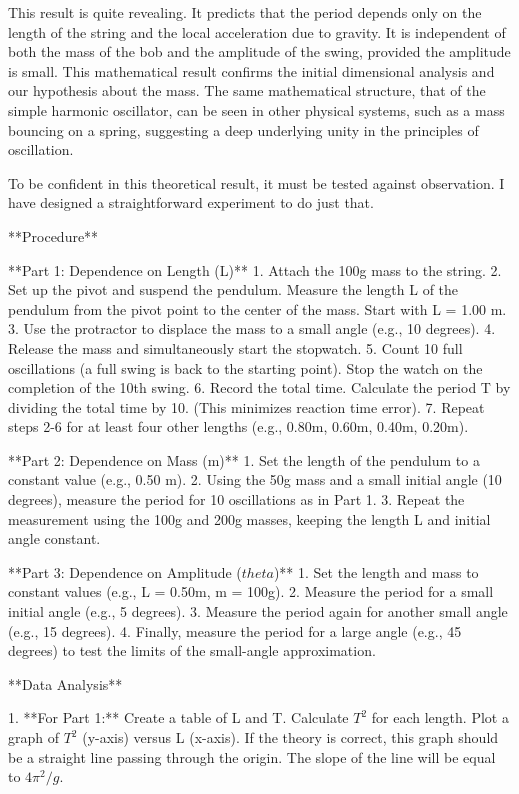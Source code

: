 \documentclass[12pt]{article}
\begin{document}
This result is quite revealing. It predicts that the period depends only on the length of the string and the local acceleration due to gravity. It is independent of both the mass of the bob and the amplitude of the swing, provided the amplitude is small. This mathematical result confirms the initial dimensional analysis and our hypothesis about the mass. The same mathematical structure, that of the simple harmonic oscillator, can be seen in other physical systems, such as a mass bouncing on a spring, suggesting a deep underlying unity in the principles of oscillation.
\par
\bigskip
To be confident in this theoretical result, it must be tested against observation. I have designed a straightforward experiment to do just that.

**Procedure**

**Part 1: Dependence on Length (L)**
1.  Attach the 100g mass to the string.
2.  Set up the pivot and suspend the pendulum. Measure the length L of the pendulum from the pivot point to the center of the mass. Start with L = 1.00 m.
3.  Use the protractor to displace the mass to a small angle (e.g., 10 degrees).
4.  Release the mass and simultaneously start the stopwatch.
5.  Count 10 full oscillations (a full swing is back to the starting point). Stop the watch on the completion of the 10th swing.
6.  Record the total time. Calculate the period T by dividing the total time by 10. (This minimizes reaction time error).
7.  Repeat steps 2-6 for at least four other lengths (e.g., 0.80m, 0.60m, 0.40m, 0.20m).

**Part 2: Dependence on Mass (m)**
1.  Set the length of the pendulum to a constant value (e.g., 0.50 m).
2.  Using the 50g mass and a small initial angle (10 degrees), measure the period for 10 oscillations as in Part 1.
3.  Repeat the measurement using the 100g and 200g masses, keeping the length L and initial angle constant.

**Part 3: Dependence on Amplitude (\(theta\))**
1.  Set the length and mass to constant values (e.g., L = 0.50m, m = 100g).
2.  Measure the period for a small initial angle (e.g., 5 degrees).
3.  Measure the period again for another small angle (e.g., 15 degrees).
4.  Finally, measure the period for a large angle (e.g., 45 degrees) to test the limits of the small-angle approximation.

**Data Analysis**

1.  **For Part 1:** Create a table of L and T. Calculate \(T^2\) for each length. Plot a graph of \(T^2\) (y-axis) versus L (x-axis). If the theory is correct, this graph should be a straight line passing through the origin. The slope of the line will be equal to \(4\pi^2/g\).
\end{document}
